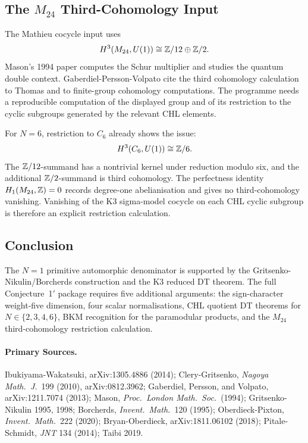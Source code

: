 \subsection*{The \(M_{24}\) Third-Cohomology Input}
\label{subsec:m24-third-cohomology}

The Mathieu cocycle input uses
\[
  H^3(M_{24},U(1))\cong\mathbb{Z}/12\oplus\mathbb{Z}/2 .
\]
Mason's 1994 paper computes the Schur multiplier and studies the quantum
double context.  Gaberdiel-Persson-Volpato cite the third cohomology
calculation to Thomas and to finite-group cohomology computations.  The
programme needs a reproducible computation of the displayed group and
of its restriction to the cyclic subgroups generated by the relevant
CHL elements.

For \(N=6\), restriction to \(C_6\) already shows the issue:
\[
  H^3(C_6,U(1))\cong\mathbb{Z}/6 .
\]
The \(\mathbb{Z}/12\)-summand has a nontrivial kernel under reduction modulo
six, and the additional \(\mathbb{Z}/2\)-summand is third cohomology.  The
perfectness identity \(H_1(M_{24},\mathbb{Z})=0\) records degree-one
abelianisation and gives no third-cohomology vanishing.  Vanishing of
the K3 sigma-model cocycle on each CHL cyclic subgroup is therefore an
explicit restriction calculation.

\subsection*{Conclusion}
\label{subsec:conj1-proof-obligation-conclusion}

The \(N=1\) primitive automorphic denominator is supported by the
Gritsenko-Nikulin/Borcherds construction and the K3 reduced DT theorem.
The full Conjecture~1$'$ package requires five additional arguments:
the sign-character weight-five dimension, four scalar normalisations,
CHL quotient DT theorems for \(N\in\{2,3,4,6\}\), BKM recognition for
the paramodular products, and the \(M_{24}\) third-cohomology
restriction calculation.

\paragraph{Primary Sources.}
Ibukiyama-Wakatsuki, arXiv:1305.4886 (2014); Clery-Gritsenko,
\emph{Nagoya Math.\ J.}\ 199 (2010), arXiv:0812.3962; Gaberdiel,
Persson, and Volpato, arXiv:1211.7074 (2013); Mason,
\emph{Proc.\ London Math.\ Soc.}\ (1994); Gritsenko-Nikulin 1995,
1998; Borcherds, \emph{Invent.\ Math.}\ 120 (1995);
Oberdieck-Pixton, \emph{Invent.\ Math.}\ 222 (2020);
Bryan-Oberdieck, arXiv:1811.06102 (2018); Pitale-Schmidt,
\emph{JNT} 134 (2014); Taibi 2019.
